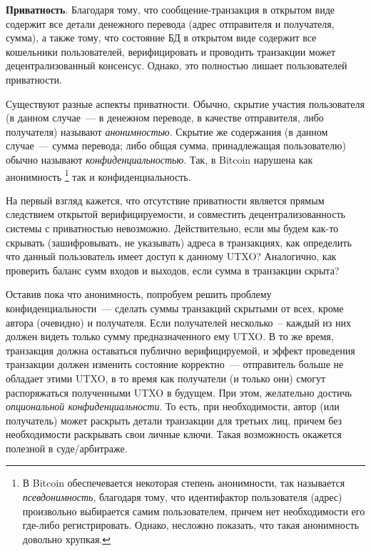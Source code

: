 \documentclass{article}
\begin{document}
{\bf Приватность}.
 Благодаря тому, что сообщение-транзакция в открытом виде
содержит все детали денежного перевода (адрес отправителя и получателя, сумма),
а также тому, что состояние БД в открытом виде содержит все кошельники пользователей,
верифицировать и проводить транзакции может децентрализованный консенсус.
Однако, это полностью лишает пользователей приватности.

Существуют разные аспекты приватности. Обычно, скрытие участия пользователя
(в данном случае~--- в денежном переводе, в качестве отправителя, либо получателя)
 называют \textit{анонимностью}. Скрытие же содержания (в данном случае~--- сумма перевода;
 либо общая сумма, принадлежащая пользователю)  обычно называют \textit{конфиденциальностью}.
Так, в Bitcoin нарушена как анонимность
\footnote{ В Bitcoin обеспечевается некоторая степень анонимности, так называется \textit{псевдонимность},
благодаря тому, что идентифактор пользователя (адрес) произвольно выбирается самим пользователем,
причем нет необходимости его где-либо регистрировать. Однако, несложно показать, что такая анонимность
довольно хрупкая.}
 так и конфиденциальность.

 На первый взгляд кажется, что отсутствие приватности является прямым следствием
 открытой верифицируемости, и совместить децентрализованность системы с приватностью невозможно.
 Действительно, если мы будем как-то скрывать (зашифровывать, не указывать) адреса в транзакциях, как определить что
 данный пользователь имеет доступ к данному UTXO?
 Аналогично, как проверить баланс сумм входов и выходов, если сумма в транзакции скрыта?


 Оставив пока что анонимность, попробуем решить проблему конфиденциальности~---
 сделать суммы транзакций скрытыми от всех, кроме автора (очевидно) и получателя.
 Если получателей несколько~-- каждый из них должен видеть только сумму предназначенного ему UTXO.
 В то же время, транзакция должна оставаться публично верифицируемой,
 и эффект проведения транзакции должен изменить состояние корректно~--- отправитель больше не обладает
 этими UTXO, в то время как получатели (и только они) смогут распоряжаться полученными UTXO в будущем.
 При этом, желательно достичь \textit{опциональной конфиденциальности}.
 То есть, при необходимости, автор (или получатель) может раскрыть детали транзакции для
 третьих лиц, причем без необходимости раскрывать свои личные ключи.
 Такая возможность окажется полезной в суде/арбитраже.
\end{document}
